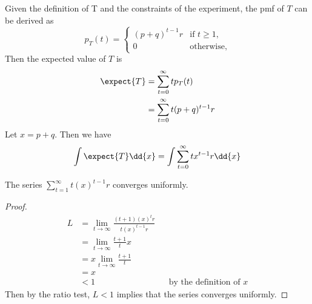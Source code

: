 \documentclass[
  coursecode={MTHE 455},
  assignmentname={Assignment \assignmentnumber},
  studentnumber=20053722,
  name={Bryan Hoang}
]{
  ltxanswer%
}
\begin{document}
  \begin{questions}
    \setcounter{question}{\questionnumber}
    \addtocounter{question}{-1}
    \question\
    \begin{parts}
      \part{}
      \begin{solution}
        Given the definition of T and the constraints of the experiment, the pmf of
        \(T\) can be derived as
        \begin{equation*}
          p_{T}(t) = \begin{cases}
            (p + q)^{t-1}r & \text{if } t \geq 1, \\
            0              & \text{otherwise},
          \end{cases}
        \end{equation*}
        Then the expected value of \(T\) is
        \begin{align*}
          \expect{T} &= \sum_{t=0}^{\infty} tp_{T}(t)       \\
                     &= \sum_{t=0}^{\infty} t(p + q)^{t-1}r
        \end{align*}
        Let \(x = p+q\). Then we have
        \begin{equation}\label{eq:integral}
          \int \expect{T} \dd{x} = \int \sum_{t=0}^{\infty} tx^{t-1}r \dd{x}
        \end{equation}
        \begin{claim}
          The series \(\sum_{t=1}^{\infty} t(x)^{t-1}r\) converges uniformly.
        \end{claim}
        \begin{proof}
          \begin{align*}
            L &= \lim_{t \to \infty} \frac{(t+1)(x)^{t}r}{t(x)^{t-1}r}                                   \\
              &= \lim_{t \to \infty} \frac{t + 1}{t}x                                                    \\
              &= x \lim_{t \to \infty} \frac{t + 1}{t}                                                   \\
              &= x                                                                                       \\
              &< 1                                                     & &\text{by the definition of } x
          \end{align*}
          Then by the ratio test, \(L < 1\) implies that the series converges uniformly.
        \end{proof}


\end{solution}
\end{parts}
\end{questions}
\end{document}
